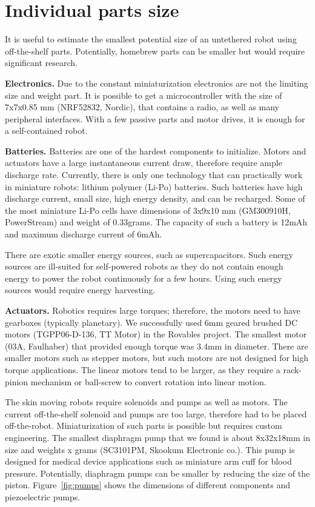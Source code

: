 \section{Individual parts size}
It is useful to estimate the smallest potential size of an untethered robot using off-the-shelf parts. Potentially, homebrew parts can be smaller but would require significant research. 

\textbf{Electronics.}
Due to the constant miniaturization electronics are not the limiting size and weight part. It is possible to get a microcontroller with the size of 7x7x0.85 mm (NRF52832, Nordic), that contains a radio, as well as many peripheral interfaces. With a few passive parts and motor drives, it is enough for a self-contained robot. 

\textbf{Batteries.}
Batteries are one of the hardest components to initialize. Motors and actuators have a large instantaneous current draw, therefore require ample discharge rate. Currently, there is only one technology that can practically work in miniature robots: lithium polymer (Li-Po) batteries. Such batteries have high discharge current, small size, high energy density, and can be recharged. Some of the most miniature Li-Po cells have dimensions of 3x9x10 mm (GM300910H, PowerStream) and weight of 0.33grams. The capacity of such a battery is 12mAh and maximum discharge current of 6mAh.  

There are exotic smaller energy sources, such as supercapacitors. Such energy sources are ill-suited for self-powered robots as they do not contain enough energy to power the robot continuously for a few hours. Using such energy sources would require energy harvesting.

\textbf{Actuators.}
Robotics requires large torques; therefore, the motors need to have gearboxes (typically planetary). We successfully used 6mm geared brushed DC motors (TGPP06-D-136, TT Motor) in the Rovables project. The smallest motor (03A, Faulhaber) that provided enough torque was 3.4mm in diameter. There are smaller motors such as stepper motors, but such motors are not designed for high torque applications.  The linear motors tend to be larger, as they require a rack-pinion mechanism or ball-screw to convert rotation into linear motion. 

The skin moving robots require solenoids and pumps as well as motors. The current off-the-shelf solenoid and pumps are too large, therefore had to be placed off-the-robot. Miniaturization of such parts is possible but requires custom engineering. The smallest diaphragm pump that we found is about 8x32x18mm in size and weights x grams (SC3101PM, Skookum Electronic co.). This pump is designed for medical device applications such as miniature arm cuff for blood pressure. Potentially, diaphragm pumps can be smaller by reducing the size of the piston. Figure~\ref{fig:pumps} shows the dimensions of different components and piezoelectric pumps.  

